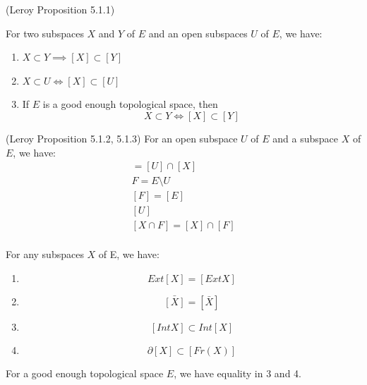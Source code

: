 \begin{lemma}
(Leroy Proposition 5.1.1)
    \label{lem:subset_to_sublocal_part_1}

    For two subspaces $X$ and $Y$ of $E$ and an open subspaces $U$ of $E$, we have:
    \begin{enumerate}
        \item $X \subset Y \implies [X] \subset [Y]$
        \item $X \subset U \iff [X] \subset [U]$
        \item If $E$ is a good enough topological space, then \[X \subset Y \iff [X] \subset [Y]\]
    \end{enumerate}
\end{lemma}

\begin{lemma}
(Leroy Proposition 5.1.2, 5.1.3)
    \label{lem:subset_to_sublocal_part_2}
    For an open subspace $U$ of $E$ and a subspace $X$ of $E$, we have:
    \begin{gather*}
    [U \cap X]
        = [U] \cap [X]\\
        F = E \setminus U\\
        [F] = [E] \\ [U]\\
        [X \cap F] = [X] \cap [F]\\
    \end{gather*}

\end{lemma}


\begin{lemma}[Part 3]
    \label{lem:subspaces_part_3}
    For any subspaces $X$ of E, we have:
    \begin{enumerate}
        \item \[Ext[X] = [Ext X]\]
        \item \[\bar{[X]} = [\bar{X}]\]
        \item \[[Int X] \subset Int[X]\]
        \item \[\partial[X] \subset [Fr(X)]\]
    \end{enumerate}
    For a good enough topological space $E$, we have equality in 3 and 4.
\end{lemma}


